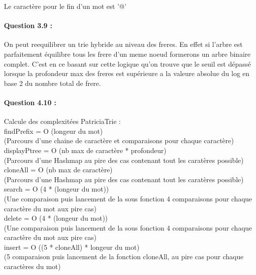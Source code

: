\documentclass{article}
\begin{document}
Le caract\`ere pour le fin d'un mot est '@'

\paragraph{Question 3.9 :}

On peut reequilibrer un trie hybride au niveau des freres.
En effet si l'arbre est parfaitement \'equilibre tous les frere d'un meme noeud
formerons un arbre binaire complet. C'est en ce basant sur cette logique qu'on
trouve que le seuil est d\'epass\'e lorsque la profondeur max des freres
est sup\'erieure a la valeure absolue du log en base 2 du nombre total de frere.\\

\paragraph{Question 4.10 :}

Calcule des complexit\'ees PatriciaTrie :\\

findPrefix = O (longeur du mot)\\
(Parcours d'une chaine de caract\`ere et comparaisons pour chaque caract\`ere)\\

displayPtree = O (nb max de caract\`ere * profondeur)\\
(Parcours d'une Hashmap au pire des cas contenant tout les carat\`eres possible)
\\

cloneAll = O (nb max de caract\`ere)\\
(Parcours d'une Hashmap au pire des cas contenant tout les carat\`eres possible)
\\

search = O (4 * (longeur du mot))\\
(Une comparaison puis lancement de la sous fonction 4 comparaisons pour chaque
caract\`ere du mot aux pire cas)\\

delete = O (4 * (longeur du mot))\\
(Une comparaison puis lancement de la sous fonction 4 comparaisons pour chaque 
caract\`ere du mot aux pire cas)\\

insert = O ((5 * cloneAll) * longeur du mot)\\
(5 comparaison puis lancement de la fonction cloneAll, au pire cas pour chaque
caract\`eres du mot)\\
\end{document}
